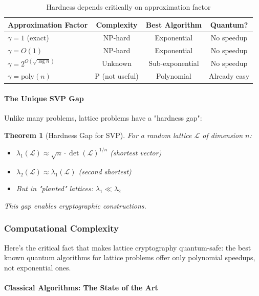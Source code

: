 \documentclass[11pt,a4paper]{article}
\newtheorem{theorem}{Theorem}
\begin{document}
\begin{table}[h]
\centering
\begin{tabular}{|l|c|c|c|}
\hline
\textbf{Approximation Factor} & \textbf{Complexity} & \textbf{Best Algorithm} & \textbf{Quantum?} \\
\hline
$\gamma = 1$ (exact) & NP-hard & Exponential & No speedup \\
$\gamma = O(1)$ & NP-hard & Exponential & No speedup \\
$\gamma = 2^{O(\sqrt{\log n})}$ & Unknown & Sub-exponential & No speedup \\
$\gamma = \text{poly}(n)$ & P (not useful) & Polynomial & Already easy \\
\hline
\end{tabular}
\caption{Hardness depends critically on approximation factor}
\end{table}

\paragraph{The Unique SVP Gap}

Unlike many problems, lattice problems have a "hardness gap":

\begin{theorem}[Hardness Gap for SVP]
For a random lattice $\mathcal{L}$ of dimension $n$:
\begin{itemize}
    \item $\lambda_1(\mathcal{L}) \approx \sqrt{n} \cdot \det(\mathcal{L})^{1/n}$ (shortest vector)
    \item $\lambda_2(\mathcal{L}) \approx \lambda_1(\mathcal{L})$ (second shortest)
    \item But in "planted" lattices: $\lambda_1 \ll \lambda_2$
\end{itemize}
This gap enables cryptographic constructions.
\end{theorem}

\subsubsection{Computational Complexity}

Here's the critical fact that makes lattice cryptography quantum-safe: the best known quantum algorithms for lattice problems offer only polynomial speedups, not exponential ones.

\paragraph{Classical Algorithms: The State of the Art}
\end{document}
